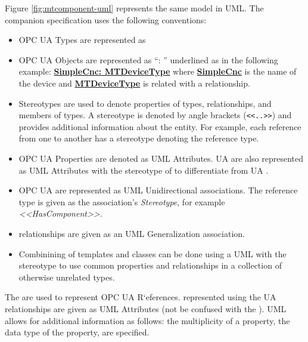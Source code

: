

Figure \ref{fig:mtcomponent-uml} represents the same model in UML. The companion specification uses the following conventions:

\begin{itemize}
\item OPC UA Types are represented as 
\item OPC UA Objects are represented as ``: '' underlined as in the following example: \textbf{\underline{SimpleCnc: MTDeviceType}} where \textbf{\underline{SimpleCnc}} is the name of the device and  \textbf{\underline{MTDeviceType}} is related with a  relationship.
\item Stereotypes are used to denote properties of types, relationships, and members of types. A stereotype is denoted by angle brackets (\texttt{<<..>>}) and provides additional information about the entity. For example, each reference from one  to another has a stereotype denoting the reference type.
\item OPC UA Properties are denoted as UML Attributes. UA  are also represented as UML Attributes with the stereotype of  to differentiate from UA .
\item OPC UA   are represented as UML Unidirectional associations. The reference type is given as the association's \textit{Stereotype}, for example \textit{<<HasComponent>>}. 
\item {} relationships are given as an UML Generalization association.
\item Combinining of templates and classes can be done using a UML  with the stereotype  to use common properties and relationships in a collection of otherwise unrelated types.
\end{itemize}

The  are used to represent OPC UA R`eferences.  represented using the UA  relationships are given as UML Attributes (not be confused with the ). UML allows for additional information as follows:  the multiplicity of a property, the data type of the property, are specified.


\FloatBarrier


